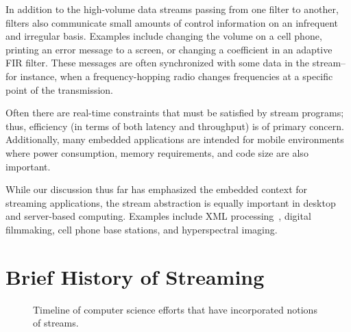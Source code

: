 
  In addition to
  the high-volume data streams passing from one filter to another,
  filters also communicate small amounts of control information on an
  infrequent and irregular basis.  Examples include changing the
  volume on a cell phone, printing an error message to a screen, or
  changing a coefficient in an adaptive FIR filter.  These messages
  are often synchronized with some data in the stream--for instance,
  when a frequency-hopping radio changes frequencies at a specific
  point of the transmission.

  Often there are real-time
  constraints that must be satisfied by stream programs; thus,
  efficiency (in terms of both latency and throughput) is of primary
  concern.  Additionally, many embedded applications are intended for
  mobile environments where power consumption, memory requirements,
  and code size are also important.

\myend

While our discussion thus far has emphasized the embedded context for
streaming applications, the stream abstraction is equally important in
desktop and server-based computing.  Examples include XML
processing~\cite{barton_streaming_2003}, digital filmmaking, cell
phone base stations, and hyperspectral imaging.


\section{Brief History of Streaming}

\begin{figure}[t]
\caption{Timeline of computer science efforts that have incorporated
  notions of streams.\protect\label{fig:history-of-streaming}}
\end{figure}

